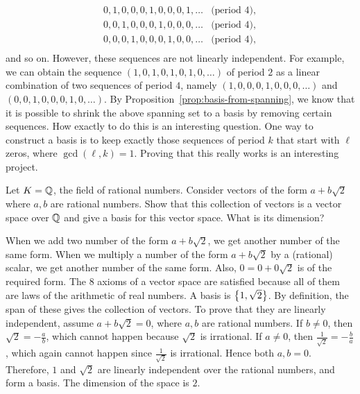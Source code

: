 \begin{ex}
\begin{sol}
\begin{enumerate}
\begin{equation*}
\begin{array}{ll}
          0,1,0,0,0,1,0,0,0,1,\ldots & \mbox{(period $4$)},\\
          0,0,1,0,0,0,1,0,0,0,\ldots & \mbox{(period $4$)},\\
          0,0,0,1,0,0,0,1,0,0,\ldots & \mbox{(period $4$)},\\
        \end{array}
      \end{equation*}
      and so on. However, these sequences are not linearly
      independent. For example, we can obtain the sequence
      $(1,0,1,0,1,0,1,0,\ldots)$ of period $2$ as a linear combination
      of two sequences of period $4$, namely
      $(1,0,0,0,1,0,0,0,\ldots)$ and $(0,0,1,0,0,0,1,0,\ldots)$. By
      Proposition~\ref{prop:basis-from-spanning}, we know that it is
      possible to shrink the above spanning set to a basis by removing
      certain sequences. How exactly to do this is an interesting
      question. One way to construct a basis is to keep exactly those
      sequences of period $k$ that start with $\ell$ zeros, where
      $\gcd(\ell,k)=1$. Proving that this really works is an
      interesting project.
    \end{enumerate}
  \end{sol}
\end{ex}

\begin{ex}
  Let $K=\mathbb{Q}$, the field of rational numbers. Consider vectors of the
  form $a+b\sqrt{2}$ where $a,b$ are rational numbers. Show that this
  collection of vectors is a vector space over $\mathbb{Q}$ and give a basis
  for this vector space. What is its dimension?
  \begin{sol}
    When we add two number of the form $a+b\sqrt{2}$, we get another
    number of the same form. When we multiply a number of the form
    $a+b\sqrt{2}$ by a (rational) scalar, we get another number of the
    same form. Also, $0=0+0\sqrt{2}$ is of the required form. The 8
    axioms of a vector space are satisfied because all of them are
    laws of the arithmetic of real numbers. A basis is
    $\left\{1,\sqrt{2}\right\}$. By definition, the span of these gives the
    collection of vectors. To prove that they are linearly
    independent, assume $a+b\sqrt{2}=0$, where $a,b$ are rational
    numbers. If $b\neq 0$, then $\sqrt{2}=-\frac{a}{b}$, which cannot
    happen because $\sqrt{2}$ is irrational. If $a\neq 0$, then
    $\frac{1}{\sqrt{2}}=-\frac{b}{a}$, which again cannot happen since
    $\frac{1}{\sqrt{2}}$ is irrational. Hence both $a,b=0$. Therefore,
    $1$ and $\sqrt{2}$ are linearly independent over the rational
    numbers, and form a basis. The dimension of the space is $2$.
  \end{sol}
\end{ex}
